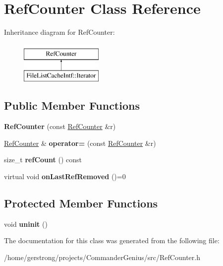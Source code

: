 \hypertarget{class_ref_counter}{
\section{RefCounter Class Reference}
\label{class_ref_counter}
}
Inheritance diagram for RefCounter:\begin{figure}[H]
\begin{center}
\leavevmode
\includegraphics[height=2cm]{class_ref_counter}
\end{center}
\end{figure}
\subsection*{Public Member Functions}
\begin{DoxyCompactItemize}
\item 
\hypertarget{class_ref_counter_aba4afacfb3157e0ccecd6575804b4d17}{
{\bfseries RefCounter} (const \hyperlink{class_ref_counter}{RefCounter} \&r)}
\label{class_ref_counter_aba4afacfb3157e0ccecd6575804b4d17}

\item 
\hypertarget{class_ref_counter_ab22a8b7cf9d6f4f7aa488020a7b6e66d}{
\hyperlink{class_ref_counter}{RefCounter} \& {\bfseries operator=} (const \hyperlink{class_ref_counter}{RefCounter} \&r)}
\label{class_ref_counter_ab22a8b7cf9d6f4f7aa488020a7b6e66d}

\item 
\hypertarget{class_ref_counter_a34ace503e1c9a8983909fc8de7917202}{
size\_\-t {\bfseries refCount} () const }
\label{class_ref_counter_a34ace503e1c9a8983909fc8de7917202}

\item 
\hypertarget{class_ref_counter_a193f56c13f29015553157158e26e095d}{
virtual void {\bfseries onLastRefRemoved} ()=0}
\label{class_ref_counter_a193f56c13f29015553157158e26e095d}

\end{DoxyCompactItemize}
\subsection*{Protected Member Functions}
\begin{DoxyCompactItemize}
\item 
\hypertarget{class_ref_counter_abcd89ed342ad4628c58817b045eda435}{
void {\bfseries uninit} ()}
\label{class_ref_counter_abcd89ed342ad4628c58817b045eda435}

\end{DoxyCompactItemize}


The documentation for this class was generated from the following file:\begin{DoxyCompactItemize}
\item 
/home/gerstrong/projects/CommanderGenius/src/RefCounter.h\end{DoxyCompactItemize}
